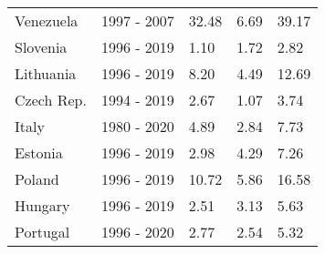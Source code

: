 \begin{table}[pos = H]
{{\begin{tabular}{lllll}
\addlinespace
Venezuela & 1997 - 2007 & 32.48 & 6.69 & 39.17\\
Slovenia & 1996 - 2019 & 1.10 & 1.72 & 2.82\\
Lithuania & 1996 - 2019 & 8.20 & 4.49 & 12.69\\
Czech Rep. & 1994 - 2019 & 2.67 & 1.07 & 3.74\\
Italy & 1980 - 2020 & 4.89 & 2.84 & 7.73\\
\addlinespace
Estonia & 1996 - 2019 & 2.98 & 4.29 & 7.26\\
Poland & 1996 - 2019 & 10.72 & 5.86 & 16.58\\
Hungary & 1996 - 2019 & 2.51 & 3.13 & 5.63\\
Portugal & 1996 - 2020 & 2.77 & 2.54 & 5.32\\
\bottomrule
\end{tabular}
}

}
\end{table}

